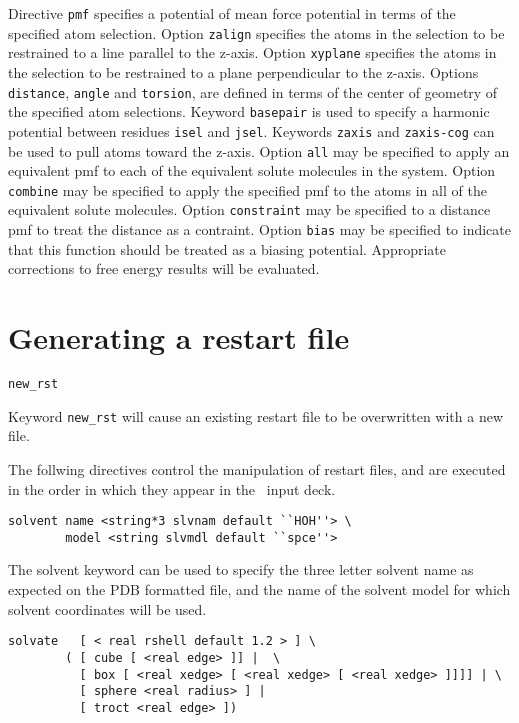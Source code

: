 Directive \verb+pmf+ specifies a potential of mean force potential
in terms of the specified atom selection. Option \verb+zalign+ specifies
the atoms in the selection to be restrained to a line parallel to the
z-axis. Option \verb+xyplane+ specifies the atoms in the selection to 
be restrained to a plane perpendicular to the z-axis. Options
\verb+distance+, \verb+angle+ and \verb+torsion+, are defined in terms
of the center of geometry of the specified atom selections.
Keyword \verb+basepair+ is used to specify a harmonic potential between
residues \verb+isel+ and \verb+jsel+. Keywords \verb+zaxis+ and \verb+zaxis-cog+
can be used to pull atoms toward the z-axis.
Option \verb+all+ may be specified to apply an equivalent pmf to each 
of the equivalent solute molecules in the system.
Option \verb+combine+ may be specified to apply the specified pmf to 
the atoms in all of the equivalent solute molecules.
Option \verb+constraint+ may be specified to a distance pmf to treat
the distance as a contraint.
Option \verb+bias+ may be specified to indicate that this function
should be treated as a biasing potential. Appropriate corrections
to free energy results will be evaluated.

\section{Generating a restart file}

\begin{verbatim}
new_rst
\end{verbatim}

Keyword \verb+new_rst+ will cause an existing restart file to be
overwritten with a new file.

The follwing directives control the manipulation of restart
files, and are executed in the order in which they
appear in the \prepare\ input deck.

\begin{verbatim}
solvent name <string*3 slvnam default ``HOH''> \
        model <string slvmdl default ``spce''>
\end{verbatim}

The solvent keyword can be used to specify the three letter solvent name 
as expected on the PDB formatted file, and the name of the solvent model
for which solvent coordinates will be used.

\begin{verbatim}
solvate   [ < real rshell default 1.2 > ] \
        ( [ cube [ <real edge> ]] |  \
          [ box [ <real xedge> [ <real xedge> [ <real xedge> ]]]] | \
          [ sphere <real radius> ] |
          [ troct <real edge> ])
\end{verbatim}

